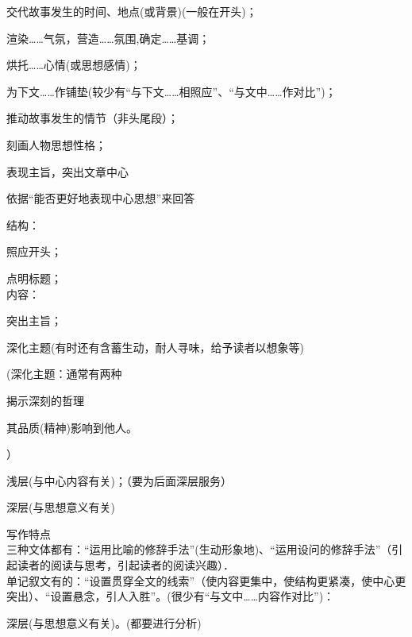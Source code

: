 \begin{asparaenum}[(1)]
\item 交代故事发生的时间、地点(或背景)(一般在开头)；
\item 渲染\ldots{}\ldots{}气氛，营造\ldots{}\ldots{}氛围,确定\ldots{}\ldots{}基调；
\item 烘托\ldots{}\ldots{}心情(或思想感情)；
\item 为下文\ldots{}\ldots{}作铺垫(较少有``与下文\ldots{}\ldots{}相照应''、``与文中\ldots{}\ldots{}作对比'')；
\item 推动故事发生的情节（非头尾段）；
\item 刻画人物思想性格；
\item 表现主旨，突出文章中心
\end{asparaenum}

依据``能否更好地表现中心思想''来回答

结构：\begin{asparaenum}[(1)]\item 照应开头；
        \item 点明标题；\\
内容：\item 突出主旨；
        \item 深化主题(有时还有含蓄生动，耐人寻味，给予读者以想象等)\end{asparaenum}
        (深化主题：通常有两种\begin{inparaenum}[(1)]\item 揭示深刻的哲理\item 其品质(精神)影响到他人。\end{inparaenum}）

\begin{asparaenum}[(1)]
\item 浅层(与中心内容有关)；（要为后面深层服务）
\item 深层(与思想意义有关)
\end{asparaenum}

\begin{asparaenum}[(1)]
\item 写作特点\\
三种文体都有：``运用比喻的修辞手法''(生动形象地)、``运用设问的修辞手法''（引起读者的阅读与思考，引起读者的阅读兴趣）．\\
单记叙文有的：``设置贯穿全文的线索''（使内容更集中，使结构更紧凑，使中心更突出）、``设置悬念，引人入胜''。(很少有``与文中\ldots{}\ldots{}内容作对比'')：\\
\item 深层(与思想意义有关)。(都要进行分析)
\end{asparaenum}

